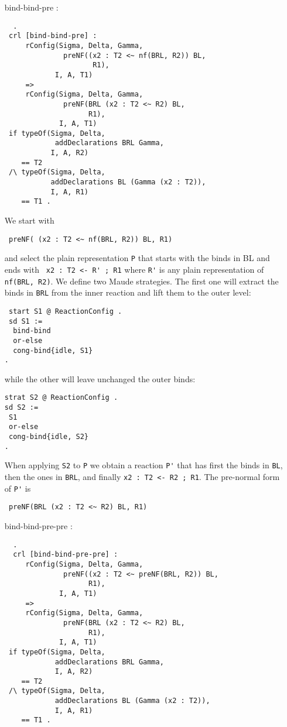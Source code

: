 \documentclass{article}
\begin{document}
\begin{itemize}
\item[bind-bind-pre]:
\begin{lstlisting}  . 
 crl [bind-bind-pre] :
     rConfig(Sigma, Delta, Gamma, 
              preNF((x2 : T2 <~ nf(BRL, R2)) BL, 
                     R1), 
            I, A, T1)
     =>  
     rConfig(Sigma, Delta, Gamma, 
              preNF(BRL (x2 : T2 <~ R2) BL, 
                    R1), 
             I, A, T1) 
 if typeOf(Sigma, Delta, 
            addDeclarations BRL Gamma, 
           I, A, R2) 
    == T2
 /\ typeOf(Sigma, Delta, 
           addDeclarations BL (Gamma (x2 : T2)), 
           I, A, R1) 
    == T1 .  
          \end{lstlisting} 
          
We start with \begin{lstlisting}
 preNF( (x2 : T2 <~ nf(BRL, R2)) BL, R1)
 \end{lstlisting} \noindent and 
select the plain representation \verb+P+ that starts with the binds in BL and ends with
\verb+ x2 : T2 <- R' ; R1+ where \verb+R'+ is any plain representation of \verb+nf(BRL, R2)+.
We define two Maude strategies. The first one will extract the binds in \verb+BRL+ from the inner reaction and lift them to the outer level:
\begin{lstlisting}
 start S1 @ ReactionConfig .
 sd S1 :=
  bind-bind 
  or-else 
  cong-bind{idle, S1}
.  
\end{lstlisting}
\noindent while the other will leave unchanged the outer binds:
\begin{lstlisting}
strat S2 @ ReactionConfig .
sd S2 := 
 S1
 or-else
 cong-bind{idle, S2}
.
     \end{lstlisting}
When applying \verb+S2+ to \verb+P+ we obtain a reaction \verb+P'+
that has first the binds in \verb+BL+, then the ones in \verb+BRL+, and finally
\verb+x2 : T2 <- R2 ; R1+. The pre-normal form of \verb+P'+ is
\begin{lstlisting}
 preNF(BRL (x2 : T2 <~ R2) BL, R1)
\end{lstlisting}
 
\item[bind-bind-pre-pre]:
\begin{lstlisting}  .
  crl [bind-bind-pre-pre] :
     rConfig(Sigma, Delta, Gamma, 
              preNF((x2 : T2 <~ preNF(BRL, R2)) BL, 
                    R1), 
             I, A, T1)
     =>  
     rConfig(Sigma, Delta, Gamma, 
              preNF(BRL (x2 : T2 <~ R2) BL, 
                    R1), 
             I, A, T1) 
 if typeOf(Sigma, Delta, 
            addDeclarations BRL Gamma,
            I, A, R2) 
    == T2
 /\ typeOf(Sigma, Delta, 
            addDeclarations BL (Gamma (x2 : T2)), 
            I, A, R1) 
    == T1 . 
\end{lstlisting}
\end{itemize}
\end{document}
